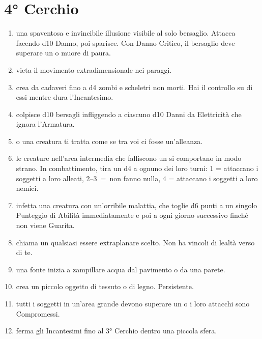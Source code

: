 \documentclass[itdr]{subfiles}
\begin{document}

\vfill
\break

\section{4° Cerchio}
\def \spellcircle {4}
\begin{enumerate}
	\item {} una spaventosa e invincibile illusione visibile al solo bersaglio. Attacca facendo d10 Danno, poi sparisce. Con Danno Critico, il bersaglio deve superare un  o muore di paura.
	\item {} vieta il movimento extradimensionale nei paraggi.
	\item {} crea da cadaveri fino a d4 zombi e scheletri non morti. Hai il \mbox{controllo} su di essi mentre dura l'Incantesimo.
	\item {} colpisce d10 bersagli infliggendo a ciascuno d10 Danni da Elettricità che ignora l'Armatura.
	\item {}  o una creatura ti tratta come se tra voi ci fosse un'alleanza.
	\item {} le creature nell'area intermedia che falliscono un  si comportano in modo strano. In combattimento, tira un d4 a ognuno dei loro turni: 1 = attaccano i soggetti a loro alleati, \mbox{2--3 = non} fanno nulla, 4 = attaccano i soggetti a loro nemici.
	\item {} infetta una creatura con un'\mbox{orribile} malattia, che toglie d6 punti a un singolo Punteggio di Abilità immediatamente e poi a ogni giorno successivo finché non viene Guarita.
	\item {} chiama un qualsiasi essere extraplanare scelto. Non ha vincoli di lealtà verso di te.
	\item {} una fonte inizia a zampillare acqua dal pavimento o da una parete.
	\item {} crea un piccolo oggetto di tessuto o di legno. Persistente.
	\item {} tutti i soggetti in un'area grande devono superare un  o i loro attacchi sono Compromessi.
	\item {} ferma gli Incantesimi fino al 3° Cerchio dentro una piccola sfera.

\end{enumerate}
\end{document}
